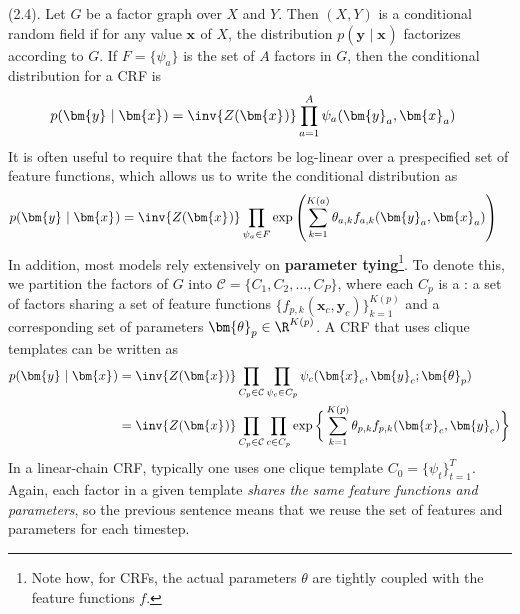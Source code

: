 \documentclass[11pt]{article}
\renewcommand\vec[2][]{\bm{#2}_{#1}}
\newcommand\myspace[1][]{\vspace{#1\bigskipamount}}
\newcommand\p{\Needspace{10\baselineskip} \noindent}
\begin{document}
\myspace
\p {} (2.4). Let $G$ be a factor graph over $X$ and $Y$. Then $(X, Y)$ is a conditional random field if for any value $\vec{x}$ of $X$, the distribution $p(\vec{y} \mid \vec{x})$ factorizes according to $G$. If $F = \{\psi_a\}$ is the set of $A$ factors in $G$, then the conditional distribution for a CRF is
\begin{align}
	p(\vec{y} \mid \vec{x}) &= \inv{Z(\vec{x})} \prod_{a = 1}^{A} \psi_a(\vec[a]{y}, \vec[a]{x})
\end{align}
It is often useful to require that the factors be log-linear over a prespecified set of feature functions, which allows us to write the conditional distribution as
\begin{align}
	p(\vec{y} \mid \vec{x}) &= \inv{Z(\vec{x})} \prod_{\psi_a \in F}
		\exp\left( \sum_{k =1}^{K(a)}  \theta_{a,k}f_{a,k}(\vec[a]{y}, \vec[a]{x} ) \right)
\end{align}
In addition, most models rely extensively on \textbf{parameter tying}\footnote{Note how, for CRFs, the actual parameters $\theta$ are tightly coupled with the feature functions $f$.}. To denote this, we partition the factors of $G$ into $\mathcal{C} = \{C_1, C_2, \ldots, C_P\}$, where each $C_p$ is a : a set of factors sharing a set of feature functions $\{f_{p,k}(\vec[c]{x}, \vec[c]{y})\}_{k=1}^{K(p)}$ and a corresponding set of parameters $\vec[p]{\theta} \in \R^{K(p)}$. A CRF that uses clique templates can be written as 
\begin{align}
	p(\vec{y} \mid \vec{x}) &= \inv{Z(\vec x)} \prod_{C_p \in \mathcal{C}} \prod_{\psi_c \in C_p} \psi_c(\vec[c]{x}, \vec[c]{y}; \vec[p]{\theta}) \\
	&= \inv{Z(\vec x)} \prod_{C_p \in \mathcal{C}} \prod_{c \in C_p}
		\exp\bigg\{ \sum_{k = 1}^{K(p)} \theta_{p,k}f_{p,k}(\vec[c]{x}, \vec[c]{y}) \bigg\}
\end{align}
In a linear-chain CRF, typically one uses one clique template $C_0 = \{\psi_t\}_{t=1}^{T}$. Again, each factor in a given template \textit{shares the same feature functions and parameters}, so the previous sentence means that we reuse the set of features and parameters for each timestep. 
\end{document}
